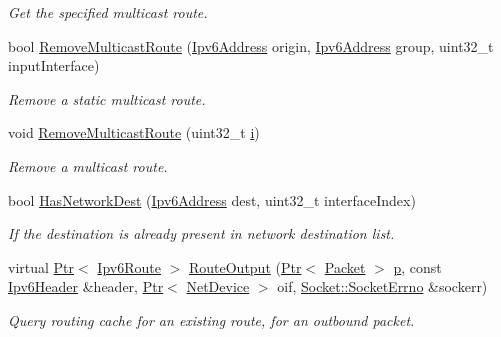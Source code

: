 \begin{DoxyCompactItemize}
\begin{DoxyCompactList}\small\item\em Get the specified multicast route. \end{DoxyCompactList}\item 
bool \hyperlink{classns3_1_1Ipv6StaticRouting_abb22fb02e9e80038383e3d4ae140ac37}{Remove\+Multicast\+Route} (\hyperlink{classns3_1_1Ipv6Address}{Ipv6\+Address} origin, \hyperlink{classns3_1_1Ipv6Address}{Ipv6\+Address} group, uint32\+\_\+t input\+Interface)
\begin{DoxyCompactList}\small\item\em Remove a static multicast route. \end{DoxyCompactList}\item 
void \hyperlink{classns3_1_1Ipv6StaticRouting_a4a3cb10ebb513dfe2bbddb8366e61ab0}{Remove\+Multicast\+Route} (uint32\+\_\+t \hyperlink{lte__uplink__power__control_8m_a6f6ccfcf58b31cb6412107d9d5281426}{i})
\begin{DoxyCompactList}\small\item\em Remove a multicast route. \end{DoxyCompactList}\item 
bool \hyperlink{classns3_1_1Ipv6StaticRouting_a64cae9e90c2a35915bd5dae9ea84728d}{Has\+Network\+Dest} (\hyperlink{classns3_1_1Ipv6Address}{Ipv6\+Address} dest, uint32\+\_\+t interface\+Index)
\begin{DoxyCompactList}\small\item\em If the destination is already present in network destination list. \end{DoxyCompactList}\item 
virtual \hyperlink{classns3_1_1Ptr}{Ptr}$<$ \hyperlink{classns3_1_1Ipv6Route}{Ipv6\+Route} $>$ \hyperlink{classns3_1_1Ipv6StaticRouting_a494b7a870cc1af31ba11611128a067a6}{Route\+Output} (\hyperlink{classns3_1_1Ptr}{Ptr}$<$ \hyperlink{classns3_1_1Packet}{Packet} $>$ \hyperlink{lte__link__budget__x2__handover__measures_8m_ac9de518908a968428863f829398a4e62}{p}, const \hyperlink{classns3_1_1Ipv6Header}{Ipv6\+Header} \&header, \hyperlink{classns3_1_1Ptr}{Ptr}$<$ \hyperlink{classns3_1_1NetDevice}{Net\+Device} $>$ oif, \hyperlink{classns3_1_1Socket_ada1328c5ae0c28cb2a982caf8f6d6cca}{Socket\+::\+Socket\+Errno} \&sockerr)
\begin{DoxyCompactList}\small\item\em Query routing cache for an existing route, for an outbound packet. \end{DoxyCompactList}\item 

\end{DoxyCompactItemize}
